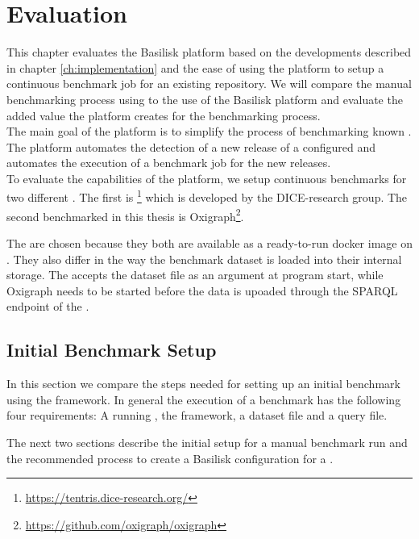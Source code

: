 \chapter{Evaluation}
\label{ch:evaluation}

This chapter evaluates the Basilisk platform based on the developments described in chapter \ref{ch:implementation} and the ease of using the platform to setup a continuous benchmark job for an existing repository.
We will compare the manual benchmarking process using \iguana{} to the use of the Basilisk platform and evaluate the added value the platform creates for the benchmarking process.
\\

The main goal of the platform is to simplify the process of benchmarking known \tsp{}. 
The platform automates the detection of a new release of a configured \ts{} and  automates the execution of a benchmark job for the new releases.
\\

To evaluate the capabilities of the platform, we setup continuous benchmarks for two different \tsp{}.
The first \ts{} is \tentris{}\footnote{\url{https://tentris.dice-research.org/}} which is developed by the DICE-research group.
The second \ts{} benchmarked in this thesis is Oxigraph\footnote{\url{https://github.com/oxigraph/oxigraph}}.

The \tsp{} are chosen because they both are available as a ready-to-run docker image on \dockh{}.
They also differ in the way the benchmark dataset is loaded into their internal storage.
The \tentris{} \ts{} accepts the dataset file as an argument at program start, while Oxigraph needs to be started before the data is upoaded through the SPARQL endpoint of the \ts{}.


\section{Initial Benchmark Setup}
In this section we compare the steps needed for setting up an initial \ts{} benchmark using the \iguana{} framework.
In general the execution of a benchmark has the following four requirements:
A running \ts{}, the \iguana{} framework, a dataset file and a query file.

The next two sections describe the initial setup for a manual benchmark run and the recommended process to create a Basilisk configuration for a \ts{}.



